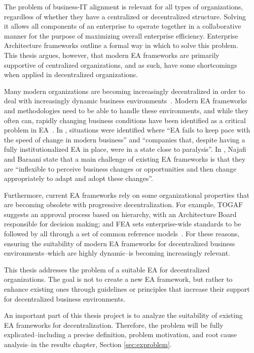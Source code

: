 The problem of business-IT alignment is relevant for all types of organizations, regardless of whether they have a centralized or decentralized structure. Solving it allows all components of an enterprise to operate together in a collaborative manner for the purpose of maximizing overall enterprise efficiency. Enterprise Architecture frameworks outline a formal way in which to solve this problem. This thesis argues, however, that modern EA frameworks are primarily supportive of centralized organizations, and as such, have some shortcomings when applied in decentralized organizations. 

Many modern organizations are becoming increasingly decentralized in order to deal with increasingly dynamic business environments~\cite{fulk1995}. Modern EA frameworks and methodologies need to be able to handle these environments, and while they often can, rapidly changing business conditions have been identified as a critical problem in EA~\cite{kaisler2005ea,lucke2010critical}. In \cite[Ch. 1]{Bente2012}, situations were identified where ``EA fails to keep pace with the speed of change in modern business'' and ``companies that, despite having a fully institutionalized EA in place, were in a state close to paralysis''. In \cite{najafi2010kasra}, Najafi and Baraani state that a main challenge of existing EA frameworks is that they are ``inflexible to perceive business changes or opportunities and then change appropriately to adapt and adopt these changes''.

Furthermore, current EA frameworks rely on some organizational properties that are becoming obsolete with progressive decentralization. For example, TOGAF~\cite[Ch. 47]{togaf9.1} suggests an approval process based on hierarchy, with an Architecture Board responsible for decision making; and FEA sets enterprise-wide standards to be followed by all through a set of common reference models~\cite{sessions2007}. For these reasons, ensuring the suitability of modern EA frameworks for  decentralized business environments--which are highly dynamic--is becoming increasingly relevant. 

This thesis addresses the problem of a suitable EA for decentralized organizations. The goal is not to create a new EA framework, but rather to enhance existing ones through guidelines or principles that increase their support for decentralized business environments.

An important part of this thesis project is to analyze the suitability of existing EA frameworks for decentralization. Therefore, the problem will be fully explicated--including a precise definition, problem motivation, and root cause analysis--in the results chapter, Section \ref{sec:exproblem}.

